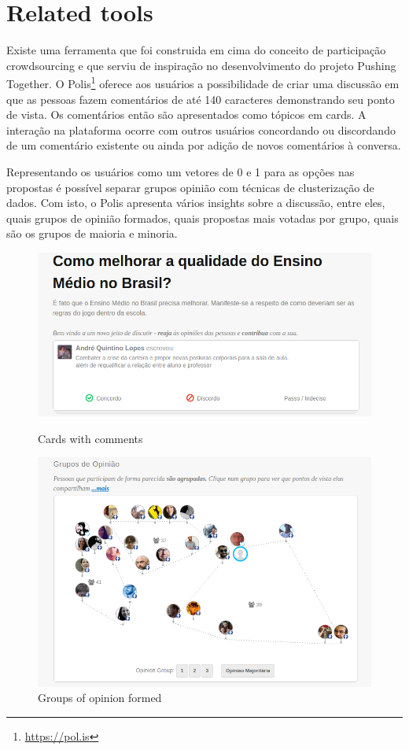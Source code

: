 \documentclass{llncs}
\begin{document}
\section{Related tools}

 Existe uma ferramenta que foi construida em cima do conceito de participação
 crowdsourcing e que serviu de inspiração no desenvolvimento do projeto Pushing
 Together. O Polis\footnote{\url{https://pol.is}} oferece aos usuários a possibilidade
 de criar uma discussão em que as pessoas fazem comentários de
 até 140 caracteres demonstrando seu ponto de vista. Os comentários então são
 apresentados como tópicos em cards. A interação na plataforma ocorre com outros
 usuários concordando ou discordando de um comentário existente ou ainda por
 adição de novos comentários à conversa.

 Representando os usuários como um vetores de 0 e 1 para as opções nas propostas
 é possível separar grupos opinião com técnicas de clusterização de dados.
 Com isto, o Polis apresenta vários insights sobre a discussão, entre eles, quais grupos de opinião formados, quais
 propostas mais votadas por grupo, quais são os grupos de maioria e minoria.

  \begin{figure}[H]
    \centering
      \begin{minipage}{.50\textwidth}
        \includegraphics[width=.9\linewidth]{images/polis1.png}
        \caption{Cards with comments}
        \label{fig:polis-2}
      \end{minipage}
      \begin{minipage}{.49\textwidth}
        \includegraphics[width=.9\linewidth]{images/polis2.png}
        \caption{Groups of opinion formed}
        \label{fig:polis-1}
      \end{minipage}
  \end{figure}
\end{document}
